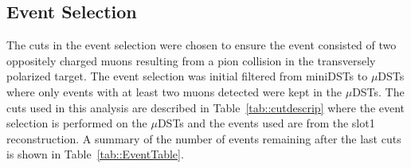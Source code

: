 \subsection{Event Selection} \label{sec::dy_eventselection}
The cuts in the event selection were chosen to ensure the event consisted of two
oppositely charged muons resulting from a pion collision in the transversely
polarized target.  The event selection was initial filtered from miniDSTs to
$\mu$DSTs where only events with at least two muons detected were kept in the
$\mu$DSTs.  The cuts used in this analysis are described in
Table~\ref{tab::cutdescrip} where the event selection is performed on the
$\mu$DSTs and the events used are from the slot1 reconstruction.  A summary of
the number of events remaining after the last cuts is shown in
Table~\ref{tab::EventTable}.

